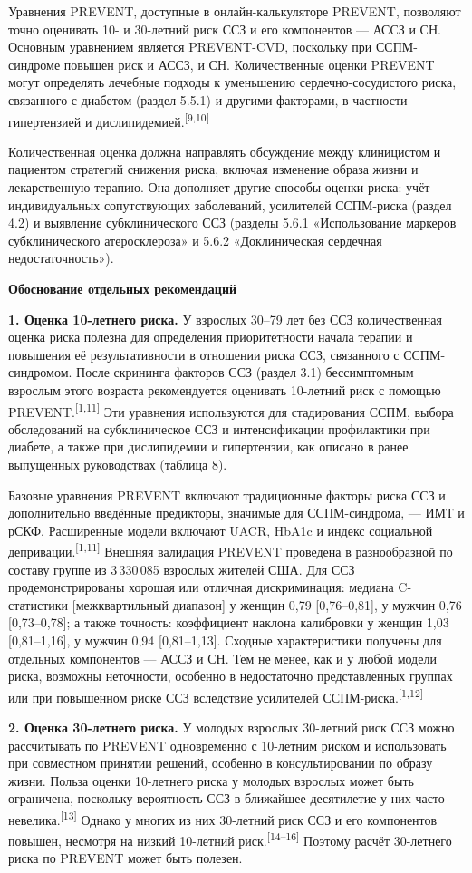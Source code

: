 \documentclass[11pt,a4paper]{article}
\newcommand{\src}[1]{\textsuperscript{[#1]}}
\newcommand{\heading}[1]{\par\medskip\textbf{#1}\par}
\begin{document}
Уравнения PREVENT, доступные в онлайн-калькуляторе PREVENT, позволяют точно оценивать 10- и 30-летний риск ССЗ и его компонентов --- АССЗ и СН. Основным уравнением является PREVENT-CVD, поскольку при ССПМ-синдроме повышен риск и АССЗ, и СН. Количественные оценки PREVENT могут определять лечебные подходы к уменьшению сердечно-сосудистого риска, связанного с диабетом (раздел 5.5.1) и другими факторами, в частности гипертензией и дислипидемией.\src{9,10}

Количественная оценка должна направлять обсуждение между клиницистом и пациентом стратегий снижения риска, включая изменение образа жизни и лекарственную терапию. Она дополняет другие способы оценки риска: учёт индивидуальных сопутствующих заболеваний, усилителей ССПМ-риска (раздел 4.2) и выявление субклинического ССЗ (разделы 5.6.1 «Использование маркеров субклинического атеросклероза» и 5.6.2 «Доклиническая сердечная недостаточность»).

\heading{Обоснование отдельных рекомендаций}
\textbf{1. Оценка 10-летнего риска.} У взрослых 30--79 лет без ССЗ количественная оценка риска полезна для определения приоритетности начала терапии и повышения её результативности в отношении риска ССЗ, связанного с ССПМ-синдромом. После скрининга факторов ССЗ (раздел 3.1) бессимптомным взрослым этого возраста рекомендуется оценивать 10-летний риск с помощью PREVENT.\src{1,11} Эти уравнения используются для стадирования ССПМ, выбора обследований на субклиническое ССЗ и интенсификации профилактики при диабете, а также при дислипидемии и гипертензии, как описано в ранее выпущенных руководствах (таблица 8).

Базовые уравнения PREVENT включают традиционные факторы риска ССЗ и дополнительно введённые предикторы, значимые для ССПМ-синдрома, --- ИМТ и рСКФ. Расширенные модели включают UACR, HbA1c и индекс социальной депривации.\src{1,11} Внешняя валидация PREVENT проведена в разнообразной по составу группе из 3\,330\,085 взрослых жителей США. Для ССЗ продемонстрированы хорошая или отличная дискриминация: медиана C-статистики [межквартильный диапазон] у женщин 0,79 [0,76--0,81], у мужчин 0,76 [0,73--0,78]; а также точность: коэффициент наклона калибровки у женщин 1,03 [0,81--1,16], у мужчин 0,94 [0,81--1,13]. Сходные характеристики получены для отдельных компонентов --- АССЗ и СН. Тем не менее, как и у любой модели риска, возможны неточности, особенно в недостаточно представленных группах или при повышенном риске ССЗ вследствие усилителей ССПМ-риска.\src{1,12}

\textbf{2. Оценка 30-летнего риска.} У молодых взрослых 30-летний риск ССЗ можно рассчитывать по PREVENT одновременно с 10-летним риском и использовать при совместном принятии решений, особенно в консультировании по образу жизни. Польза оценки 10-летнего риска у молодых взрослых может быть ограничена, поскольку вероятность ССЗ в ближайшее десятилетие у них часто невелика.\src{13} Однако у многих из них 30-летний риск ССЗ и его компонентов повышен, несмотря на низкий 10-летний риск.\src{14--16} Поэтому расчёт 30-летнего риска по PREVENT может быть полезен.
\end{document}
